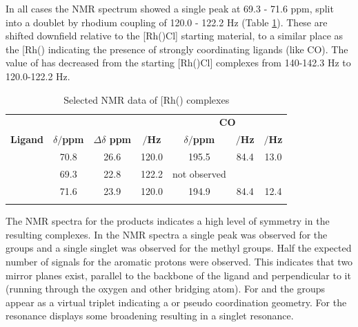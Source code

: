 In all cases the \phosphorus{} NMR spectrum showed a single peak at 69.3 - 71.6 ppm, split into a doublet by rhodium coupling of 120.0 - 122.2 Hz (Table \ref{table:rhodiumcarbonyl}).  These are shifted downfield relative to the [Rh(\tBuxantphosk)Cl] starting material, to a similar place as the [Rh(\tBuxantphosk)\ce{(H)2Cl]} indicating the presence of strongly coordinating ligands (like CO).  The value of \JRhP{} has decreased from the starting [Rh(\tBuxantphosk)Cl] complexes from 140-142.3 Hz to 120.0-122.2 Hz.

\begin{table}[htbp]
\caption[Selected NMR data of [Rh(\tBuxantphos)\ce{(CO)2Cl}{]} complexes]{Selected NMR data of [Rh(\tBuxantphos)\ce{(CO)2Cl]} complexes}
\vspace{1em}
\label{table:rhodiumcarbonyl}
\small
\begin{center}
\begin{tabular}{ c c c c c c c}
	\toprule{}
	~ & \multicolumn{3}{c}{\bfseries{\phosphorus}} & \multicolumn{3}{c}{\bfseries{\carbon{} CO}} \\
	\cmidrule(lr){2-4} \cmidrule(lr){5-7}
	\bfseries{Ligand}&\bfseries{$\delta/$ppm}&\bfseries{$\Delta\delta$ ppm}&\bfseries{\JRhP{}$/$Hz}&\bfseries{$\delta/$ppm}&\bfseries{\JRhC $/$Hz}&\bfseries{\JPC $/$Hz}\\
	\midrule{}
	\tBusixantphos	&	70.8	&	26.6 & 120.0	&	195.5	& 84.4	& 13.0\\
	\tButhixantphos	& 	69.3	&	22.8	& 122.2	&	not observed	& 	& \\
	\tBuxantphos	&	71.6	&	23.9	& 120.0	&	194.9	& 84.4	& 12.4\\
	\bottomrule{}
\end{tabular}
\end{center}
\end{table}


The NMR spectra for the products indicates a high level of symmetry in the resulting complexes.  
In the \proton{} NMR spectra a single peak was observed for the \tBu{} groups and a single singlet was observed for the methyl groups.  Half the expected number of signals for the aromatic protons were observed.  This indicates that two mirror planes exist, parallel to the backbone of the ligand and perpendicular to it (running through the oxygen and other bridging atom).  For \tBusixantphos{} and \tBuxantphos{} the \tBu{} groups appear as a virtual triplet indicating a \trans{} or pseudo \trans{} coordination geometry.  For \tButhixantphos{} the \tBu{} resonance displays some broadening resulting in a singlet resonance.

